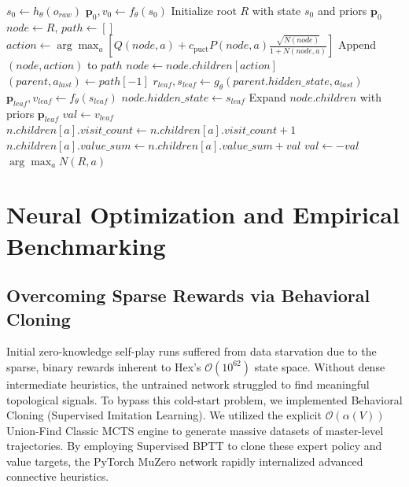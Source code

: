 \documentclass[12pt,a4paper]{article}
\begin{document}
\begin{algorithm}[H]
\caption{Latent MCTS (MuZero Latent Space Paradigm)}
\begin{algorithmic}[1]
    \State $s_0 \gets h_\theta(o_{raw})$ 
    \State $\mathbf{p}_0, v_0 \gets f_\theta(s_0)$
    \State Initialize root $R$ with state $s_0$ and priors $\mathbf{p}_0$
        \State $node \gets R$, $path \gets []$
         
            \State $action \gets \arg\max_{a} \left[ Q(node, a) + c_{\text{puct}} P(node, a) \frac{\sqrt{N(node)}}{1 + N(node, a)} \right]$
            \State Append $(node, action)$ to $path$
            \State $node \gets node.children[action]$
        \EndWhile
        \State $(parent, a_{last}) \gets path[-1]$ 
        \State $r_{leaf}, s_{leaf} \gets g_\theta(parent.hidden\_state, a_{last})$
        \State $\mathbf{p}_{leaf}, v_{leaf} \gets f_\theta(s_{leaf})$
        \State $node.hidden\_state \gets s_{leaf}$
        \State Expand $node.children$ with priors $\mathbf{p}_{leaf}$
        \State $val \gets v_{leaf}$
         
            \State $n.children[a].visit\_count \gets n.children[a].visit\_count + 1$
            \State $n.children[a].value\_sum \gets n.children[a].value\_sum + val$
            \State $val \gets -val$ 
        \EndFor
    \EndFor
    \State \Return $\arg\max_{a} N(R, a)$
\EndFunction
\end{algorithmic}
\end{algorithm}

\section{Neural Optimization and Empirical Benchmarking}

\subsection{Overcoming Sparse Rewards via Behavioral Cloning}
Initial zero-knowledge self-play runs suffered from data starvation due to the sparse, binary rewards inherent to Hex's $\mathcal{O}(10^{62})$ state space. Without dense intermediate heuristics, the untrained network struggled to find meaningful topological signals. To bypass this cold-start problem, we implemented Behavioral Cloning (Supervised Imitation Learning). We utilized the explicit $\mathcal{O}(\alpha(V))$ Union-Find Classic MCTS engine to generate massive datasets of master-level trajectories. By employing Supervised BPTT to clone these expert policy and value targets, the PyTorch MuZero network rapidly internalized advanced connective heuristics.
\end{document}
